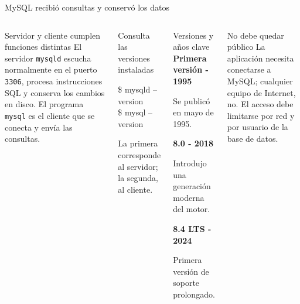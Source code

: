 \documentclass[aspectratio=169,10pt,c]{beamer}
\begin{document}
\begin{frame}{MySQL recibió consultas y conservó los datos}
\begin{columns}[T,onlytextwidth]
\begin{block}{Servidor y cliente cumplen funciones distintas}
\small El servidor \texttt{mysqld} escucha normalmente en el puerto \texttt{3306}, procesa instrucciones SQL y conserva los cambios en disco. El programa \texttt{mysql} es el cliente que se conecta y envía las consultas.
\end{block}
\begin{exampleblock}{Consulta las versiones instaladas}
\begin{terminal}\footnotesize
\$ mysqld --version\\
\$ mysql --version
\end{terminal}
\small La primera corresponde al servidor; la segunda, al cliente.
\end{exampleblock}
\begin{exampleblock}{Versiones y años clave}
\small
\textbf{Primera versión - 1995}\par
Se publicó en mayo de 1995.\par\medskip
\textbf{8.0 - 2018}\par
Introdujo una generación moderna del motor.\par\medskip
\textbf{8.4 LTS - 2024}\par
Primera versión de soporte prolongado.
\end{exampleblock}
\begin{block}{No debe quedar público}
\small La aplicación necesita conectarse a MySQL; cualquier equipo de Internet, no. El acceso debe limitarse por red y por usuario de la base de datos.
\end{block}
\end{columns}
\end{frame}
\end{document}
